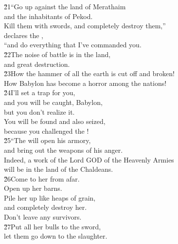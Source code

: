 \begin{poetry}
\poeml \v{21}``Go up against the land of Merathaim \\
\poemll    and the inhabitants of Pekod. \\
\poeml Kill them with swords, and completely destroy them,'' \\
\poemll    declares the , \\
\poemlll       ``and do everything that I've commanded you. \\
\poeml \v{22}The noise of battle is in the land, \\
\poemll    and great destruction. \\
\poeml \v{23}How the hammer of all the earth is cut off and broken! \\
\poemll    How Babylon has become a horror among the nations! \\
\poeml \v{24}I'll set a trap for you, \\
\poemll    and you will be caught, Babylon, \\
\poemlll       but you don't realize it. \\
\poeml You will be found and also seized, \\
\poemll    because you challenged the ! \\
\poeml \v{25}``The  will open his armory, \\
\poemll    and bring out the weapons of his anger. \\
\poeml Indeed, a work of the Lord GOD of the Heavenly Armies \\
\poemll    will be in the land of the Chaldeans. \\
\poeml \v{26}Come to her from afar. \\
\poemll    Open up her barns. \\
\poeml Pile her up like heaps of grain, \\
\poemll    and completely destroy her. \\
\poemlll       Don't leave any survivors. \\
\poeml \v{27}Put all her bulls to the sword, \\
\poemll    let them go down to the slaughter. \\

\end{poetry}
